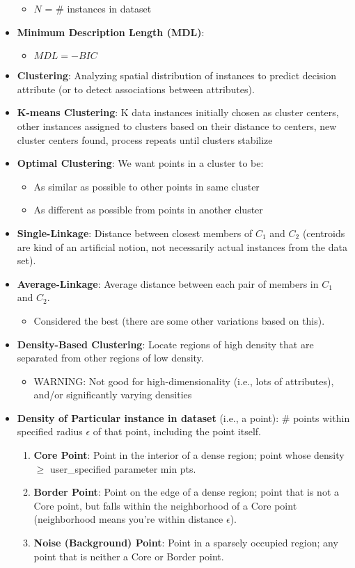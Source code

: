 \documentclass{article}
\begin{document}
\begin{itemize}
\begin{itemize}
			\item $N$ = \# instances in dataset
		\end{itemize}
	\item {\bf Minimum Description Length (MDL)}:
		\begin{itemize}
			\item $MDL = -BIC$
		\end{itemize}
	\item {\bf Clustering}: Analyzing spatial distribution of instances to predict decision attribute (or to detect associations between attributes).
	\item {\bf K-means Clustering}: K data instances initially chosen as cluster centers, other instances assigned to clusters based on their distance to centers, new cluster centers found, process repeats until clusters stabilize
	\item {\bf Optimal Clustering}: We want points in a cluster to be:
		\begin{itemize}
			\item As similar as possible to other points in same cluster
			\item As different as possible from points in another cluster
		\end{itemize}
	\item {\bf Single-Linkage}: Distance between closest members of $C_1$ and $C_2$ (centroids are kind of an artificial notion, not necessarily actual instances from the data set).
	\item {\bf Average-Linkage}: Average distance between each pair of members in $C_1$ and $C_2$. 
		\begin{itemize}
			\item Considered the best (there are some other variations based on this).
		\end{itemize}
	\item {\bf Density-Based Clustering}: Locate regions of high density that are separated from other regions of low density.
		\begin{itemize}
			\item WARNING: Not good for high-dimensionality (i.e., lots of attributes), and/or significantly varying densities
		\end{itemize}
	\item {\bf Density of Particular instance in dataset} (i.e., a point): \# points within specified radius  $\epsilon$ of that point, including the point itself.
		\begin{enumerate}
			\item {\bf Core Point}: Point in the interior of a dense region; point whose density $\geq$ user_specified parameter min pts.
			\item {\bf Border Point}: Point on the edge of a dense region; point that is not a Core point, but falls within the neighborhood of a Core point (neighborhood means you're within distance $\epsilon$).
			\item {\bf Noise (Background) Point}: Point in a sparsely occupied region; any point that is neither a Core or Border point. 
		\end{enumerate}
	
\end{itemize}
\end{document}
